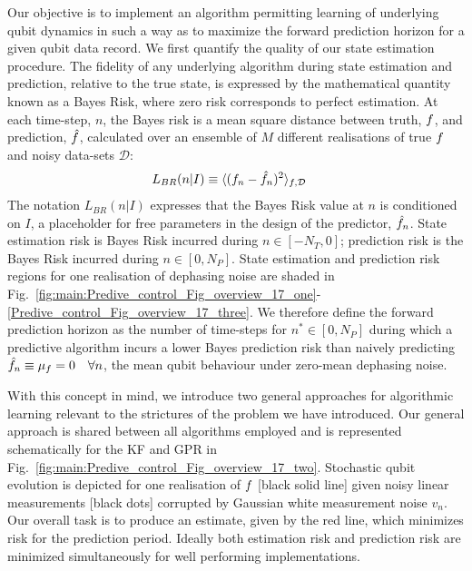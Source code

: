 Our objective is to implement an algorithm permitting learning of underlying qubit dynamics in such a way as to maximize the forward prediction horizon for a given qubit data record.  We first quantify the quality of our state estimation procedure.  The fidelity of any underlying algorithm during state estimation and prediction, relative to the true state, is expressed by the mathematical quantity known as a Bayes Risk, where zero risk corresponds to perfect estimation. At each time-step, $n$, the Bayes risk is a mean square distance between truth, $f$, and prediction, $\hat{f}$, calculated over an ensemble of $M$ different realisations of true $f$ and noisy data-sets $\mathcal{D}$:
\begin{align}
	L_{BR}(n | I) & \equiv \langle(f_n - \hat{f}_n)^2 \rangle_{f,\mathcal{D}} \label{eqn:main:sec:ap_opt_LossBR}
\end{align}
The notation $L_{BR}(n | I)$ expresses that the Bayes Risk value at $n$ is conditioned on $I$, a placeholder for free parameters in the design of the predictor, $\hat{f}_n$. State estimation risk is Bayes Risk incurred during $n \in [-N_T, 0]$; prediction risk is the Bayes Risk incurred during $n \in [0, N_P]$. State estimation and prediction risk regions for one realisation of dephasing noise are shaded in Fig.~\ref{fig:main:Predive_control_Fig_overview_17_one}-\ref{Predive_control_Fig_overview_17_three}.  We therefore define the forward prediction horizon as the number of time-steps for $ n^{*} \in [0, N_P]$ during which a predictive algorithm incurs a lower Bayes prediction risk than naively predicting $\hat{f}_n \equiv \mu_f = 0 \quad \forall n$, the mean qubit behaviour under zero-mean dephasing noise. 

With this concept in mind, we introduce two general approaches for algorithmic learning relevant to the strictures of the problem we have introduced.  Our general approach is shared between all algorithms employed and is represented schematically for the KF and GPR in Fig.~\ref{fig:main:Predive_control_Fig_overview_17_two}. Stochastic qubit evolution is depicted for one realisation of $f$ [black solid line] given noisy linear measurements [black dots] corrupted by Gaussian white measurement noise $v_n$.  Our overall task is to produce an estimate, given by the red line, which minimizes risk for the prediction period.  Ideally both estimation risk and prediction risk are minimized simultaneously for well performing implementations.

